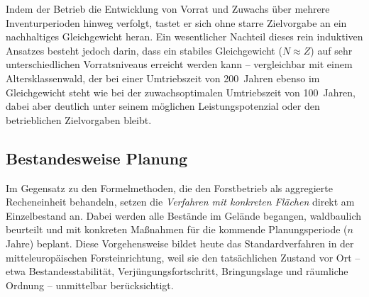 \documentclass[twocolumn, paper=a4, fontsize=10pt]{scrartcl}
\begin{document}
Indem der Betrieb die Entwicklung von Vorrat und Zuwachs über mehrere Inventurperioden hinweg verfolgt, tastet er sich ohne starre Zielvorgabe an ein nachhaltiges Gleichgewicht heran. Ein wesentlicher Nachteil dieses rein induktiven Ansatzes besteht jedoch darin, dass ein stabiles Gleichgewicht ($N \approx Z$) auf sehr unterschiedlichen Vorratsniveaus erreicht werden kann -- vergleichbar mit einem Altersklassenwald, der bei einer Umtriebszeit von 200~Jahren ebenso im Gleichgewicht steht wie bei der zuwachsoptimalen Umtriebszeit von 100~Jahren, dabei aber deutlich unter seinem möglichen Leistungspotenzial oder den betrieblichen Zielvorgaben bleibt.

\subsection{Bestandesweise Planung}

Im Gegensatz zu den Formelmethoden, die den Forstbetrieb als aggregierte Recheneinheit behandeln, setzen die \emph{Verfahren mit konkreten Flächen} direkt am Einzelbestand an. Dabei werden alle Bestände im Gelände begangen, waldbaulich beurteilt und mit konkreten Maßnahmen für die kommende Planungsperiode ($n$ Jahre) beplant. Diese Vorgehensweise bildet heute das Standardverfahren in der mitteleuropäischen Forsteinrichtung, weil sie den tatsächlichen Zustand vor Ort -- etwa Bestandesstabilität, Verjüngungsfortschritt, Bringungslage und räumliche Ordnung -- unmittelbar berücksichtigt.
\end{document}
